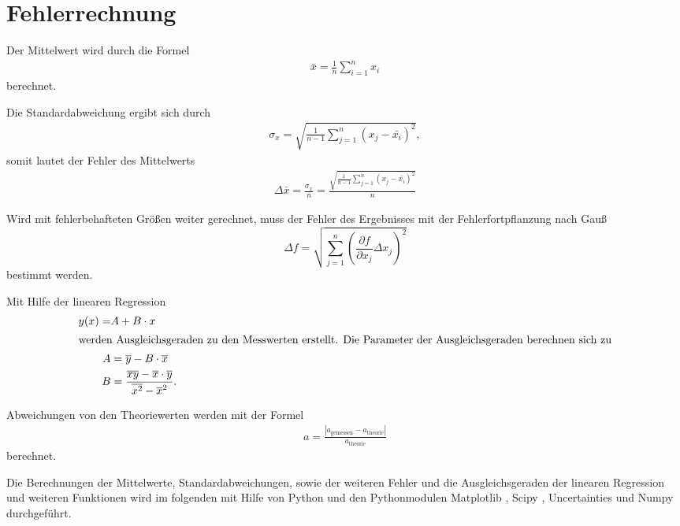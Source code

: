 \section{Fehlerrechnung}
\label{sec:Fehlerrechnung}

Der Mittelwert wird durch die Formel
\begin{align*}
    \bar{x}=\frac{1}{n} \sum_{i=1}^n x_i \label{eqn:Mittelwert}
\end{align*}
berechnet.

Die Standardabweichung ergibt sich durch
\begin{align*}
    \sigma_x=\sqrt{\frac{1}{n-1}\sum_{j=1}^n (x_j-\bar{x_i})^2},
\end{align*}
somit lautet der Fehler des Mittelwerts
\begin{align*}
    \Delta \bar{x}= \frac{\sigma_x}{n} = \frac{\sqrt{\frac{1}{n-1}\sum_{j=1}^n (x_j-\bar{x_i})^2}}{n}
\end{align*}

Wird mit fehlerbehafteten Größen weiter gerechnet, muss der Fehler des Ergebnisses mit der Fehlerfortpflanzung nach Gauß
\begin{equation*}
    \Delta f=\sqrt{\sum_{j=1}^n \left(\frac{\partial f}{\partial x_j}\Delta x_j \right)^{2} }\label{eqn:Gauß}
\end{equation*}
bestimmt werden.

Mit Hilfe der linearen Regression 
\begin{align*}
    y(x)=&A+B\cdot x\\\label{eqn:lin}
    \intertext{werden Ausgleichsgeraden zu den Messwerten erstellt. Die Parameter der Ausgleichsgeraden berechnen sich zu}
    A&=\overline{y}-B\cdot \overline{x}\\
    B&=\frac{\overline{xy}-\overline{x}\cdot \overline{y}}{\overline{x^2}-\overline{x}^2}.
\end{align*}

Abweichungen von den Theoriewerten werden mit der Formel
\begin{align}
  a=\frac{|a_\mathrm{gemessen}-a_\mathrm{theorie}|}{a_\mathrm{theorie}} \label{eqn:abweich}
\end{align}
berechnet.

Die Berechnungen der Mittelwerte, Standardabweichungen, sowie der weiteren Fehler und die Ausgleichsgeraden der linearen Regression und weiteren Funktionen
wird im folgenden mit Hilfe von Python \cite{python} und den Pythonmodulen Matplotlib \cite{matplotlib}, Scipy \cite{scipy}, Uncertainties \cite{unceratainties} und Numpy \cite{numpy}
durchgeführt.